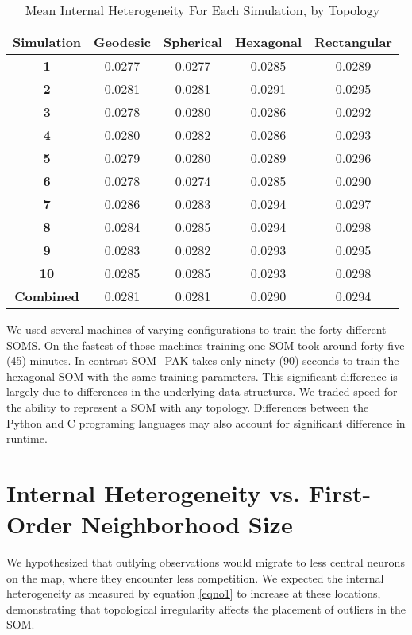 \begin{table}[hbt]
\caption{Mean Internal Heterogeneity For Each Simulation, by Topology}
\label{ivtable3}
\begin{tabular}{|c||c|c|c|c|}
\hline
\textbf{Simulation} & Geodesic & Spherical & Hexagonal & Rectangular \\
\hline
\hline
\textbf{1} & 0.0277 & 0.0277 & 0.0285 & 0.0289 \\
\textbf{2} & 0.0281 & 0.0281 & 0.0291 & 0.0295 \\
\textbf{3} & 0.0278 & 0.0280 & 0.0286 & 0.0292 \\
\textbf{4} & 0.0280 & 0.0282 & 0.0286 & 0.0293 \\
\textbf{5} & 0.0279 & 0.0280 & 0.0289 & 0.0296 \\
\textbf{6} & 0.0278 & 0.0274 & 0.0285 & 0.0290 \\
\textbf{7} & 0.0286 & 0.0283 & 0.0294 & 0.0297 \\
\textbf{8} & 0.0284 & 0.0285 & 0.0294 & 0.0298 \\
\textbf{9} & 0.0283 & 0.0282 & 0.0293 & 0.0295 \\
\textbf{10}& 0.0285 & 0.0285 & 0.0293 & 0.0298 \\
\hline
\hline
\textbf{Combined} & 0.0281 & 0.0281 & 0.0290 & 0.0294\\
\hline
\end{tabular} \end{table}

We used several machines of varying configurations to train the forty
different SOMS.  On the fastest of those machines training one SOM took
around forty-five (45) minutes.  In contrast SOM\_PAK takes only ninety (90)
seconds to train the hexagonal SOM with the same training parameters.  This
significant difference is largely due to differences in the underlying data
structures.  We traded speed for the ability to represent a SOM with any
topology.  Differences between the Python and C programing languages may also
account for significant difference in runtime.


\section{Internal Heterogeneity vs. First-Order Neighborhood Size}
\label{rdq1}
We hypothesized that outlying observations would migrate to less central neurons on the map, where
they encounter less competition.  We expected the internal heterogeneity
as measured by equation \ref{eqno1} to increase at these locations,
demonstrating that topological irregularity affects the placement of outliers
in the SOM.  

